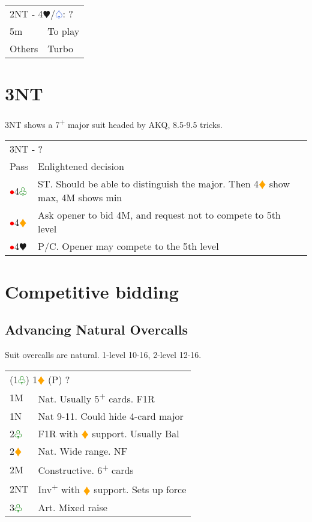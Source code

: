 \documentclass{article}
\renewcommand{\sp}{\textcolor{RoyalBlue}{$\varspade$}}
\newcommand{\he}{\textcolor{RubineRed}{$\varheart$}}
\newcommand{\di}{\textcolor{Orange}{$\vardiamond$}}
\newcommand{\cl}{\textcolor{Green}{$\varclub$}}
\newcommand{\nt}{\relsize{-1}NT\relsize{1}}
\newcommand{\up}{\textsuperscript{+}}
\newcommand{\al}{\textcolor{red}{$\bullet$}}
\begin{document}
\medskip

\begin{tabular}{|l|p{6.5cm}}
	\multicolumn{2}{l}{2\nt{} - 4\he/\sp{}: ?}\\
	5m & To play \\
	Others & Turbo \\
\end{tabular}

\section{3\nt{}}

3\nt{} shows a 7\up{} major suit headed by AKQ, 8.5-9.5 tricks. \\

\begin{tabular}{|l|p{6.5cm}}
	\multicolumn{2}{l}{3\nt{} - ?}\\
	Pass & Enlightened decision \\
	\al{}4\cl{} & ST. Should be able to distinguish the major. Then 4\di{} show max, 4M shows min \\
	\al{}4\di{} & Ask opener to bid 4M, and request not to compete to 5th level \\
	\al{}4\he{} & P/C. Opener may compete to the 5th level \\
\end{tabular}

\section{Competitive bidding}

\subsection{Advancing Natural Overcalls}
Suit overcalls are natural. 1-level 10-16, 2-level 12-16. \\

\begin{tabular}{|l|p{6.5cm}}
	\multicolumn{2}{l}{(1\cl{}) 1\di{} (P) ? } \\
	1M & Nat. Usually 5\up{} cards. F1R \\
	1N & Nat 9-11. Could hide 4-card major \\
	2\cl{} & F1R with \di{} support. Usually Bal \\
	2\di{} & Nat. Wide range. NF \\
	2M & Constructive. 6\up{} cards \\
	2\nt{} & Inv\up{} with \di{} support. Sets up force \\
	3\cl{} & Art. Mixed raise \\
\end{tabular}
\end{document}
